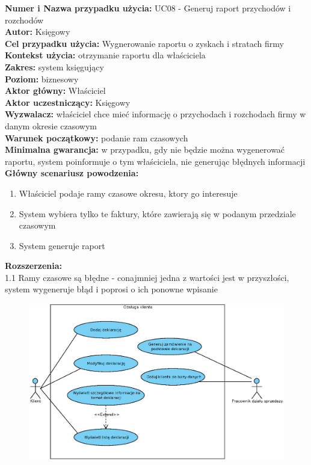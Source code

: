 \textbf{Numer i Nazwa przypadku użycia:} UC08 - Generuj raport przychodów i rozchodów \\
\textbf{Autor:} Księgowy\\
\textbf{Cel przypadku użycia:} Wygnerowanie raportu o zyskach i stratach firmy \\
\textbf{Kontekst użycia:} otrzymanie raportu dla właściciela  \\
\textbf{Zakres:} system księgujący \\
\textbf{Poziom:} biznesowy \\
\textbf{Aktor główny:} Właściciel \\
\textbf{Aktor uczestniczący:} Księgowy \\
\textbf{Wyzwalacz:} właściciel chce mieć informację o przychodach i rozchodach firmy w danym okresie czasowym \\
\textbf{Warunek początkowy:} podanie ram czasowych  \\
\textbf{Minimalna gwarancja:} w przypadku, gdy nie będzie można wygenerować raportu, system poinformuje o tym właściciela, nie generując błędnych informacji \\
\textbf{Główny scenariusz powodzenia:} 
	\begin{enumerate}
		\item Właściciel podaje ramy czasowe okresu, ktory go interesuje
		\item System wybiera tylko te faktury, które zawierają się w podanym przedziale czasowym
		\item System generuje raport
	\end{enumerate}
\textbf{Rozszerzenia:} \\
1.1 Ramy czasowe są błędne - conajmniej jedna z wartości jest w przyszłości, system wygeneruje błąd i poprosi o ich ponowne wpisanie


\begin{figure}[H]
	\centering
	\includegraphics[width=1.1\textwidth]{img/UC/deklaracje.eps}
\end{figure}
